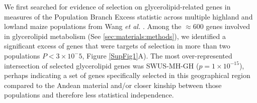 \documentclass[9pt,twocolumn,twoside,lineno]{BioRxiv}
\begin{document}
We first searched for evidence of selection on  glycerolipid-related genes in measures of the Population Branch Excess \citep[PBE; ][]{Pool2017-oa} statistic across multiple highland and lowland maize populations from Wang \textit{et al.} \cite{Wang2020-mp}.
%
%
Among the $\approx 600$ genes involved in glycerolipid metabolism (See \ref{sec:materials:methods}), we identified a significant excess of genes that were targets of selection in more than two populations $P< 3 \times 10^-5$, Figure \ref{SupFig1}A).
The most over-represented intersection of selected glycerolipid genes was SWUS-MH-GH ($p = 1  \times 10 ^{-15} $), perhaps indicating a set of genes specifically selected in this geographical region compared to the Andean material and/or closer kinship between those populations and therefore less statistical independence.  
\end{document}
